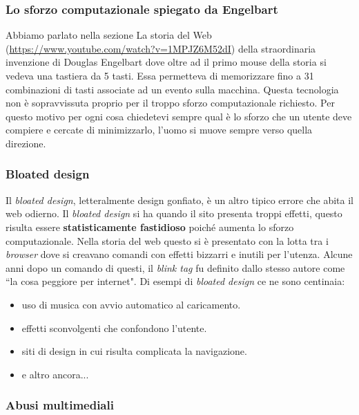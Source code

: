 		\subsubsection{Lo sforzo computazionale spiegato da Engelbart}
			Abbiamo parlato nella sezione La storia del Web (\url{https://www.youtube.com/watch?v=1MPJZ6M52dI}) della straordinaria invenzione di Douglas Engelbart dove oltre ad il primo mouse della storia si vedeva una tastiera da 5 tasti. Essa permetteva di memorizzare fino a 31 combinazioni di tasti associate ad un evento sulla macchina. Questa tecnologia non è sopravvissuta proprio per il troppo sforzo computazionale richiesto. Per questo motivo per ogni cosa chiedetevi sempre qual è lo sforzo che un utente deve compiere e cercate di minimizzarlo, l'uomo si muove sempre verso quella direzione.
		
		\subsubsection{Bloated design}
			Il \emph{bloated design}, letteralmente design gonfiato, è un altro tipico errore che abita il web odierno. Il \emph{bloated design} si ha quando il sito presenta troppi effetti, questo risulta essere \textbf{statisticamente fastidioso} poiché aumenta lo sforzo computazionale.
			Nella storia del web questo si è presentato con la lotta tra i \emph{browser} dove si creavano comandi con effetti bizzarri e inutili per l'utenza. Alcune anni dopo un comando di questi, il \emph{blink tag} fu definito dallo stesso autore come ``la cosa peggiore per internet".
			Di esempi di \emph{bloated design} ce ne sono centinaia:
			\begin{itemize}
				\item uso di musica con avvio automatico al caricamento.
				\item effetti sconvolgenti che confondono l'utente.
				\item siti di design in cui risulta complicata la navigazione.
				\item e altro ancora...
			\end{itemize}
		
		\subsubsection{Abusi multimediali}
			
